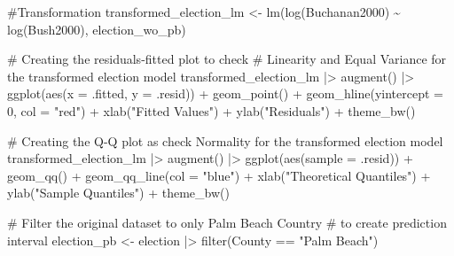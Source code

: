 \documentclass[
  letterpaper,
  DIV=11,
  numbers=noendperiod]{scrartcl}
\newenvironment{Shaded}{\begin{snugshade}}{\end{snugshade}}
\newcommand{\AttributeTok}[1]{\textcolor[rgb]{0.40,0.45,0.13}{#1}}
\newcommand{\CommentTok}[1]{\textcolor[rgb]{0.37,0.37,0.37}{#1}}
\newcommand{\DecValTok}[1]{\textcolor[rgb]{0.68,0.00,0.00}{#1}}
\newcommand{\FunctionTok}[1]{\textcolor[rgb]{0.28,0.35,0.67}{#1}}
\newcommand{\NormalTok}[1]{\textcolor[rgb]{0.00,0.23,0.31}{#1}}
\newcommand{\OtherTok}[1]{\textcolor[rgb]{0.00,0.23,0.31}{#1}}
\newcommand{\SpecialCharTok}[1]{\textcolor[rgb]{0.37,0.37,0.37}{#1}}
\newcommand{\StringTok}[1]{\textcolor[rgb]{0.13,0.47,0.30}{#1}}
\begin{document}
\begin{Shaded}
\begin{Highlighting}[]
\CommentTok{\#Transformation}
\NormalTok{transformed\_election\_lm }\OtherTok{\textless{}{-}} \FunctionTok{lm}\NormalTok{(}\FunctionTok{log}\NormalTok{(Buchanan2000) }\SpecialCharTok{\textasciitilde{}} \FunctionTok{log}\NormalTok{(Bush2000), election\_wo\_pb)}

\CommentTok{\# Creating the residuals{-}fitted plot to check }
\CommentTok{\# Linearity and Equal Variance for the transformed election model}
\NormalTok{transformed\_election\_lm }\SpecialCharTok{|\textgreater{}}
  \FunctionTok{augment}\NormalTok{() }\SpecialCharTok{|\textgreater{}}
  \FunctionTok{ggplot}\NormalTok{(}\FunctionTok{aes}\NormalTok{(}\AttributeTok{x =}\NormalTok{ .fitted, }\AttributeTok{y =}\NormalTok{ .resid)) }\SpecialCharTok{+}
  \FunctionTok{geom\_point}\NormalTok{() }\SpecialCharTok{+}
  \FunctionTok{geom\_hline}\NormalTok{(}\AttributeTok{yintercept =} \DecValTok{0}\NormalTok{, }\AttributeTok{col =} \StringTok{"red"}\NormalTok{) }\SpecialCharTok{+}
  \FunctionTok{xlab}\NormalTok{(}\StringTok{"Fitted Values"}\NormalTok{) }\SpecialCharTok{+}
  \FunctionTok{ylab}\NormalTok{(}\StringTok{"Residuals"}\NormalTok{) }\SpecialCharTok{+}
  \FunctionTok{theme\_bw}\NormalTok{()}

\CommentTok{\# Creating the Q{-}Q plot as check Normality for the transformed election model}
\NormalTok{transformed\_election\_lm }\SpecialCharTok{|\textgreater{}}
  \FunctionTok{augment}\NormalTok{() }\SpecialCharTok{|\textgreater{}}
  \FunctionTok{ggplot}\NormalTok{(}\FunctionTok{aes}\NormalTok{(}\AttributeTok{sample =}\NormalTok{ .resid)) }\SpecialCharTok{+}
  \FunctionTok{geom\_qq}\NormalTok{() }\SpecialCharTok{+}
  \FunctionTok{geom\_qq\_line}\NormalTok{(}\AttributeTok{col =} \StringTok{"blue"}\NormalTok{) }\SpecialCharTok{+}
  \FunctionTok{xlab}\NormalTok{(}\StringTok{"Theoretical Quantiles"}\NormalTok{) }\SpecialCharTok{+}
  \FunctionTok{ylab}\NormalTok{(}\StringTok{"Sample Quantiles"}\NormalTok{) }\SpecialCharTok{+}
  \FunctionTok{theme\_bw}\NormalTok{()}

\CommentTok{\# Filter the original dataset to only Palm Beach Country}
\CommentTok{\# to create prediction interval}
\NormalTok{election\_pb }\OtherTok{\textless{}{-}}\NormalTok{ election }\SpecialCharTok{|\textgreater{}} \FunctionTok{filter}\NormalTok{(County }\SpecialCharTok{==} \StringTok{"Palm Beach"}\NormalTok{)}


\end{Highlighting}
\end{Shaded}
\end{document}
